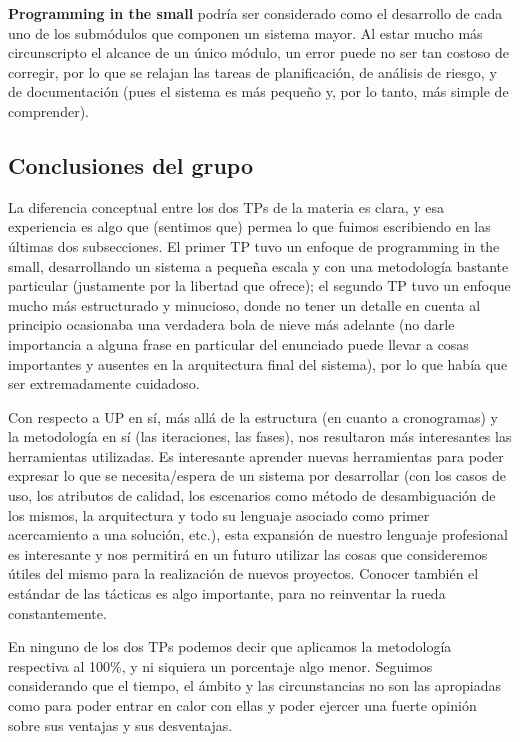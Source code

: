 \textbf{Programming in the small} podría ser considerado como el desarrollo de cada uno de los submódulos que componen un sistema mayor. Al estar mucho más circunscripto el alcance de un único módulo, un error puede no ser tan costoso de corregir, por lo que se relajan las tareas de planificación, de análisis de riesgo, y de documentación (pues el sistema es más pequeño y, por lo tanto, más simple de comprender).

\newpage
\subsection{Conclusiones del grupo}
La diferencia conceptual entre los dos TPs de la materia es clara, y esa experiencia es algo que (sentimos que) permea lo que fuimos escribiendo en las últimas dos subsecciones. El primer TP tuvo un enfoque de programming in the small, desarrollando un sistema a pequeña escala y con una metodología bastante particular (justamente por la libertad que ofrece); el segundo TP tuvo un enfoque mucho más estructurado y minucioso, donde no tener un detalle en cuenta al principio ocasionaba una verdadera bola de nieve más adelante (no darle importancia a alguna frase en particular del enunciado puede llevar a cosas importantes y ausentes en la arquitectura final del sistema), por lo que había que ser extremadamente cuidadoso.

Con respecto a UP en sí, más allá de la estructura (en cuanto a cronogramas) y la metodología en sí (las iteraciones, las fases), nos resultaron más interesantes las herramientas utilizadas. Es interesante aprender nuevas herramientas para poder expresar lo que se necesita/espera de un sistema por desarrollar (con los casos de uso, los atributos de calidad, los escenarios como método de desambiguación de los mismos, la arquitectura y todo su lenguaje asociado como primer acercamiento a una solución, etc.), esta expansión de nuestro lenguaje profesional es interesante y nos permitirá en un futuro utilizar las cosas que consideremos útiles del mismo para la realización de nuevos proyectos. Conocer también el estándar de las tácticas es algo importante, para no reinventar la rueda constantemente.

En ninguno de los dos TPs podemos decir que aplicamos la metodología respectiva al 100\%, y ni siquiera un porcentaje algo menor. Seguimos considerando que el tiempo, el ámbito y las circunstancias no son las apropiadas como para poder entrar en calor con ellas y poder ejercer una fuerte opinión sobre sus ventajas y sus desventajas.

